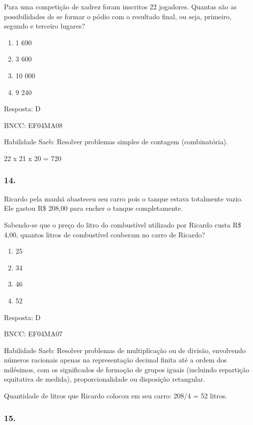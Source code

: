 Para uma competição de xadrez foram inscritos 22 jogadores. Quantas são
as possibilidades de se formar o pódio com o resultado final, ou seja,
primeiro, segundo e terceiro lugares?

\begin{enumerate}
\def\labelenumi{\alph{enumi})}
\item
  1 690
\item
  3 600
\item
  10 000
\item
  9 240
\end{enumerate}

Resposta: D

BNCC: EF04MA08

Habilidade Saeb: Resolver problemas simples de contagem (combinatória).

22 x 21 x 20 = 720

\subsubsection{14.}\label{section-170}

Ricardo pela manhã abasteceu seu carro pois o tanque estava totalmente
vazio. Ele gastou R\$ 208,00 para encher o tanque completamente.

Sabendo-se que o preço do litro do combustível utilizado por Ricardo
custa R\$ 4,00, quantos litros de combustível couberam no carro de
Ricardo?

\begin{enumerate}
\def\labelenumi{\alph{enumi})}
\item
  25
\item
  34
\item
  46
\item
  52
\end{enumerate}

Resposta: D

BNCC: EF04MA07

Habilidade Saeb: Resolver problemas de multiplicação ou de divisão,
envolvendo números racionais apenas na representação decimal finita até
a ordem dos milésimos, com os significados de formação de grupos iguais
(incluindo repartição equitativa de medida), proporcionalidade ou
disposição retangular.

Quantidade de litros que Ricardo colocou em seu carro: 208/4 = 52
litros.

\subsubsection{15.}\label{section-171}

